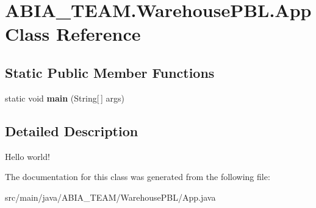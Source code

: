 \hypertarget{class_a_b_i_a___t_e_a_m_1_1_warehouse_p_b_l_1_1_app}{}\section{A\+B\+I\+A\+\_\+\+T\+E\+A\+M.\+Warehouse\+P\+B\+L.\+App Class Reference}
\label{class_a_b_i_a___t_e_a_m_1_1_warehouse_p_b_l_1_1_app}
\subsection*{Static Public Member Functions}
\begin{DoxyCompactItemize}
\item 
\mbox{\label{class_a_b_i_a___t_e_a_m_1_1_warehouse_p_b_l_1_1_app_a9923248d5b8376013d2f8524c71efe26}} 
static void {\bfseries main} (String\mbox{[}$\,$\mbox{]} args)
\end{DoxyCompactItemize}


\subsection{Detailed Description}
Hello world! 

The documentation for this class was generated from the following file\+:\begin{DoxyCompactItemize}
\item 
src/main/java/\+A\+B\+I\+A\+\_\+\+T\+E\+A\+M/\+Warehouse\+P\+B\+L/App.\+java\end{DoxyCompactItemize}
